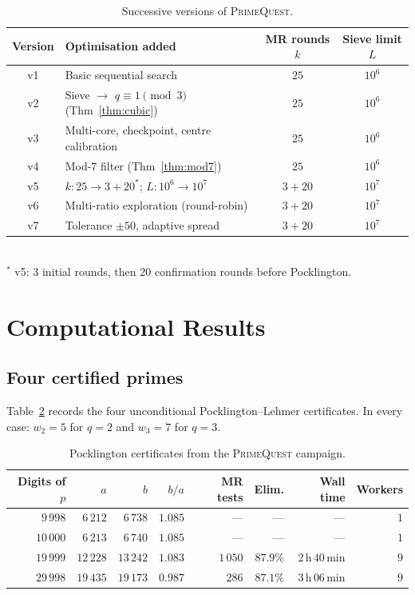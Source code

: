 \documentclass[11pt,a4paper]{article}
\theoremstyle{definition}
\theoremstyle{remark}
\begin{document}
\begin{table}[ht]\centering
\caption{Successive versions of \textsc{PrimeQuest}.}
\label{tab:versions}
\begin{tabular}{@{}clcc@{}}
\toprule
Version & Optimisation added & MR rounds $k$ & Sieve limit $L$ \\
\midrule
v1 & Basic sequential search & $25$ & $10^6$ \\
v2 & Sieve $\to$ $q\equiv 1\pmod{3}$ (Thm~\ref{thm:cubic}) & $25$ & $10^6$ \\
v3 & Multi-core, checkpoint, centre calibration & $25$ & $10^6$ \\
v4 & Mod-$7$ filter (Thm~\ref{thm:mod7}) & $25$ & $10^6$ \\
v5 & $k\colon 25\to 3+20^{*}$; $L\colon 10^6\to 10^7$ & $3+20$ & $10^7$ \\
v6 & Multi-ratio exploration (round-robin) & $3+20$ & $10^7$ \\
v7 & Tolerance $\pm 50$, adaptive spread & $3+20$ & $10^7$ \\
\bottomrule
\end{tabular}\\[3pt]
\footnotesize $^{*}$ v5: $3$ initial rounds, then $20$ confirmation rounds
before Pocklington.
\end{table}

\section{Computational Results}\label{sec:results}

\subsection{Four certified primes}

\begin{resultbox}
Table~\ref{tab:results} records the four unconditional
Pocklington--Lehmer certificates. In every case: $w_2=5$ for $q=2$
and $w_3=7$ for $q=3$.
\end{resultbox}

\begin{table}[ht]\centering
\caption{Pocklington certificates from the \textsc{PrimeQuest} campaign.}
\label{tab:results}
\begin{tabular}{@{}rrrrrrrr@{}}
\toprule
Digits of $p$ & $a$ & $b$ & $b/a$ & MR tests & Elim. & Wall time & Workers \\
\midrule
$9\,998$  & $6\,212$  & $6\,738$  & $1.085$ & ---      & ---    & ---            & $1$ \\
$10\,000$ & $6\,213$  & $6\,740$  & $1.085$ & ---      & ---    & ---            & $1$ \\
$19\,999$ & $12\,228$ & $13\,242$ & $1.083$ & $1\,050$ & $87.9\%$ & $2$\,h\,$40$\,min & $9$ \\
$29\,998$ & $19\,435$ & $19\,173$ & $0.987$ & $286$    & $87.1\%$ & $3$\,h\,$06$\,min & $9$ \\
\bottomrule
\end{tabular}
\end{table}
\end{document}
